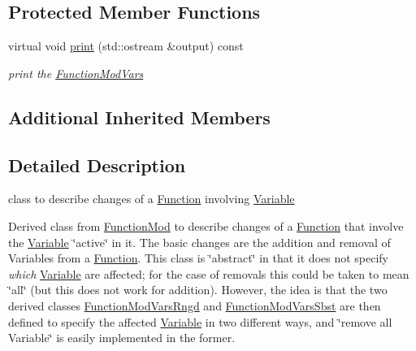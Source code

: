 \subsection*{Protected Member Functions}
\begin{DoxyCompactItemize}
\item 
\mbox{\label{class_s_m_spp__di__unipi__it_1_1_function_mod_vars_a2e7b9c9148a98c5c342e8c25cac95926}} 
virtual void \mbox{\hyperlink{class_s_m_spp__di__unipi__it_1_1_function_mod_vars_a2e7b9c9148a98c5c342e8c25cac95926}{print}} (std\+::ostream \&output) const
\begin{DoxyCompactList}\small\item\em print the \mbox{\hyperlink{class_s_m_spp__di__unipi__it_1_1_function_mod_vars}{Function\+Mod\+Vars}} \end{DoxyCompactList}\end{DoxyCompactItemize}
\subsection*{Additional Inherited Members}


\subsection{Detailed Description}
class to describe changes of a \mbox{\hyperlink{class_s_m_spp__di__unipi__it_1_1_function}{Function}} involving \mbox{\hyperlink{class_s_m_spp__di__unipi__it_1_1_variable}{Variable}} 

Derived class from \mbox{\hyperlink{class_s_m_spp__di__unipi__it_1_1_function_mod}{Function\+Mod}} to describe changes of a \mbox{\hyperlink{class_s_m_spp__di__unipi__it_1_1_function}{Function}} that involve the \mbox{\hyperlink{class_s_m_spp__di__unipi__it_1_1_variable}{Variable}} \char`\"{}active\char`\"{} in it. The basic changes are the addition and removal of Variables from a \mbox{\hyperlink{class_s_m_spp__di__unipi__it_1_1_function}{Function}}. This class is \char`\"{}abstract\char`\"{} in that it does not specify {\itshape which} \mbox{\hyperlink{class_s_m_spp__di__unipi__it_1_1_variable}{Variable}} are affected; for the case of removals this could be taken to mean \char`\"{}all\char`\"{} (but this does not work for addition). However, the idea is that the two derived classes \mbox{\hyperlink{class_s_m_spp__di__unipi__it_1_1_function_mod_vars_rngd}{Function\+Mod\+Vars\+Rngd}} and \mbox{\hyperlink{class_s_m_spp__di__unipi__it_1_1_function_mod_vars_sbst}{Function\+Mod\+Vars\+Sbst}} are then defined to specify the affected \mbox{\hyperlink{class_s_m_spp__di__unipi__it_1_1_variable}{Variable}} in two different ways, and \char`\"{}remove all Variable\char`\"{} is easily implemented in the former.

